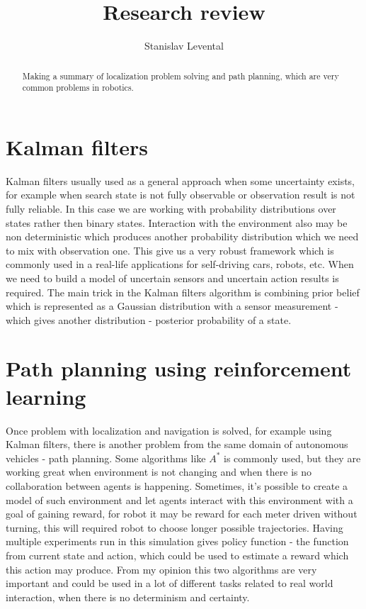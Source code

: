 \documentclass[11pt]{article}
\title{\LARGE \bf Research review}
\author{Stanislav Levental}
\begin{document}
\maketitle

\begin{abstract}

Making a summary of localization problem solving and path planning, which are very common problems in robotics.
\end{abstract}

\section{Kalman filters}

Kalman filters usually used as a general approach when some uncertainty exists, for example when search state is not fully observable or observation result is not fully reliable. In this case we are working with probability distributions over states rather then binary states. Interaction with the environment also may be non deterministic which produces another probability distribution which we need to mix with observation one. This give us a very robust framework which is commonly used in a real-life applications for self-driving cars, robots, etc. When we need to build a model of uncertain sensors and uncertain action results is required. The main trick in the Kalman filters algorithm is combining prior belief which is represented as a Gaussian distribution with a sensor measurement - which gives another distribution - posterior probability of a state. 

\section{Path planning using reinforcement learning}

Once problem with localization and navigation is solved, for example using Kalman filters, there is another problem from the same domain of autonomous vehicles - path planning. Some algorithms like $A^{*}$ is commonly used, but they are working great when environment is not changing and when there is no collaboration between agents is happening. Sometimes, it's possible to create a model of such environment and let agents interact with this environment with a goal of gaining reward, for robot it may be reward for each meter driven without turning, this will required robot to choose longer possible trajectories. Having multiple experiments run in this simulation gives policy function - the function from current state and action, which could be used to estimate a reward which this action may produce. From my opinion this two algorithms are very important and could be used in a lot of different tasks related to real world interaction, when there is no determinism and certainty. 
\end{document}
